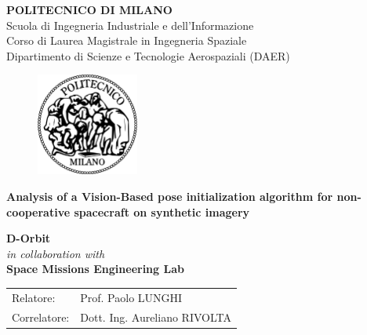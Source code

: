 \begin{titlepage}

\begin{center}
\Large\textbf{{\textsc{POLITECNICO DI MILANO}}}\\
\Large{Scuola di Ingegneria Industriale e dell'Informazione}\\
\large{Corso di Laurea Magistrale in Ingegneria Spaziale}\\
\large{Dipartimento di Scienze e Tecnologie Aerospaziali (DAER)}
\par\end{center}

\vspace{0.5cm}

\begin{center}
\begin{figure}[h]
\centering{}\includegraphics[width=0.3\textwidth]{title-page/logo-polimi}
\end{figure}
\vspace{0.5cm}
\par\end{center}

\begin{center}
\textbf{\LARGE{Analysis of a Vision-Based pose initialization algorithm for non-cooperative spacecraft on synthetic imagery}}\vspace{0.5cm}
\vspace{0.2cm}
\par\end{center}

\begin{center}
\textbf{D-Orbit}\\
\textit{in collaboration with}\\
\textbf{Space Missions Engineering Lab}
\end{center}\vspace{1.5cm}

\begin{flushleft}
\begin{tabular}{ll}
Relatore:  & Prof. Paolo LUNGHI\tabularnewline
Correlatore: & Dott. Ing. Aureliano RIVOLTA\tabularnewline
\end{tabular}\vspace{1.8cm}
\par\end{flushleft}


\end{titlepage}
